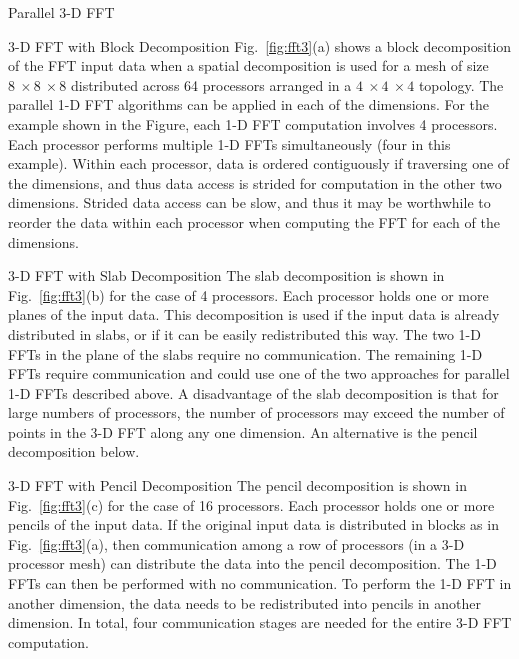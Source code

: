  {Parallel 3-D FFT}

 {3-D FFT with Block Decomposition}  
Fig.~\ref{fig:fft3}(a) shows a block decomposition of the FFT input
data when a spatial decomposition is used for a mesh of size $8~\times
8~\times 8$ distributed across 64 processors arranged in a $4~\times
4~\times 4$ topology.  The parallel 1-D FFT algorithms can be applied in
each of the dimensions.  For the example shown in the Figure, each 1-D
FFT computation involves 4 processors.  Each processor performs multiple
1-D FFTs simultaneously (four in this example).  Within each processor,
data is ordered contiguously if traversing one of the dimensions, and
thus data access is strided for computation in the other two dimensions.
Strided data access can be slow, and thus it may be worthwhile to reorder
the data within each processor when computing the FFT for each of the dimensions.

 {3-D FFT with Slab Decomposition}  
The slab decomposition is shown in 
Fig.~\ref{fig:fft3}(b) for the case of 4 processors.  Each processor holds
one or more planes of the input data.  This decomposition is used if
the input data is already distributed in slabs, or if it can be easily
redistributed this way.  The two 1-D FFTs in the plane of the slabs
require no communication.  The remaining 1-D FFTs require communication
and could use one of the two approaches for parallel 1-D FFTs described above.  
A disadvantage
of the slab decomposition is that for large numbers of processors, the
number of processors may exceed the number of points in the 3-D FFT along
any one dimension.  An alternative is the pencil decomposition below.

 {3-D FFT with Pencil Decomposition}  
The pencil decomposition
is shown in Fig.~\ref{fig:fft3}(c) for the case of 16 processors.
Each processor holds one or more pencils of the input data.  If the
original input data is distributed in blocks as in Fig.~\ref{fig:fft3}(a),
then communication among a row of processors (in a 3-D processor mesh)
can distribute the data into the pencil decomposition.  The 1-D FFTs
can then be performed with no communication.  To perform the 1-D FFT in
another dimension, the data needs to be redistributed into pencils in
another dimension.  In total, four communication stages are needed for
the entire 3-D FFT computation.


